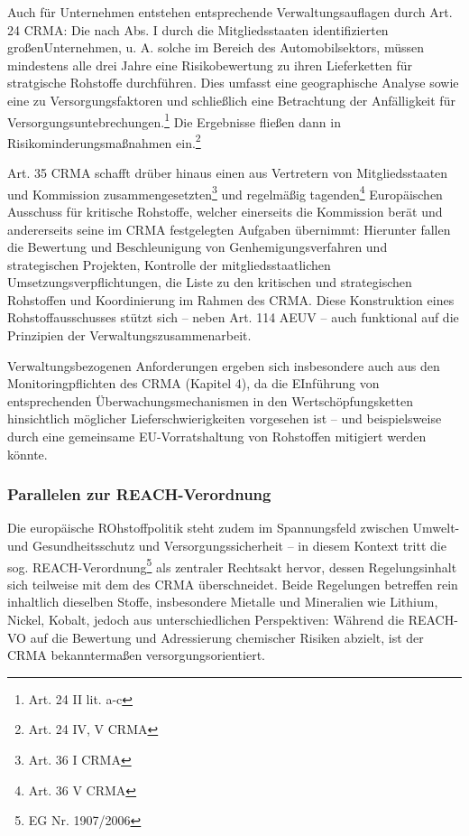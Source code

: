 \documentclass[12pt,a4paper,oneside]{book} %
\begin{document}
Auch für Unternehmen entstehen entsprechende Verwaltungsauflagen durch Art. 24 CRMA: Die nach Abs. I durch die Mitgliedsstaaten identifizierten \glqq großen\grqq Unternehmen, u. A. solche im Bereich des Automobilsektors, müssen mindestens alle drei Jahre eine Risikobewertung zu ihren Lieferketten für stratgische Rohstoffe durchführen. Dies umfasst eine geographische Analyse sowie eine zu Versorgungsfaktoren und schließlich eine Betrachtung der Anfälligkeit für Versorgungsuntebrechungen.\footnote{Art. 24 II lit. a-c} Die Ergebnisse fließen dann in Risikominderungsmaßnahmen ein.\footnote{Art. 24 IV, V CRMA}


Art. 35 CRMA schafft drüber hinaus einen aus Vertretern von Mitgliedsstaaten und Kommission zusammengesetzten\footnote{Art. 36 I CRMA} und regelmäßig tagenden\footnote{Art. 36 V CRMA} Europäischen Ausschuss für kritische Rohstoffe, welcher einerseits die Kommission berät und andererseits seine im CRMA festgelegten Aufgaben übernimmt: Hierunter fallen die Bewertung und Beschleunigung von Genhemigungsverfahren und strategischen Projekten, Kontrolle der mitgliedsstaatlichen Umsetzungsverpflichtungen, die Liste zu den kritischen und strategischen Rohstoffen und Koordinierung im Rahmen des CRMA.
Diese Konstruktion eines Rohstoffausschusses stützt sich – neben Art. 114 AEUV – auch funktional auf die Prinzipien der Verwaltungszusammenarbeit.

Verwaltungsbezogenen Anforderungen ergeben sich insbesondere auch aus den Monitoringpflichten des CRMA (Kapitel 4), da die EInführung von entsprechenden Überwachungsmechanismen in den Wertschöpfungsketten hinsichtlich möglicher Lieferschwierigkeiten vorgesehen ist -- und beispielsweise durch eine gemeinsame EU-Vorratshaltung von Rohstoffen mitigiert werden könnte.

\subsubsection{Parallelen zur REACH-Verordnung}
Die europäische ROhstoffpolitik steht zudem im Spannungsfeld zwischen Umwelt- und Gesundheitsschutz und Versorgungssicherheit -- in diesem Kontext tritt die sog. REACH-Verordnung\footnote{EG Nr. 1907/2006} als zentraler Rechtsakt hervor, dessen Regelungsinhalt sich teilweise mit dem des CRMA überschneidet. Beide Regelungen betreffen rein inhaltlich dieselben Stoffe, insbesondere Mietalle und Mineralien wie Lithium, Nickel, Kobalt, jedoch aus unterschiedlichen Perspektiven: Während die REACH-VO auf die Bewertung und Adressierung chemischer Risiken abzielt, ist der CRMA bekanntermaßen versorgungsorientiert. 
\end{document}
